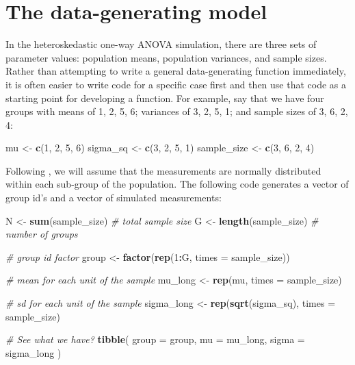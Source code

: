 \documentclass[
]{book}
\newenvironment{Shaded}{\begin{snugshade}}{\end{snugshade}}
\newcommand{\AttributeTok}[1]{\textcolor[rgb]{0.13,0.29,0.53}{#1}}
\newcommand{\CommentTok}[1]{\textcolor[rgb]{0.56,0.35,0.01}{\textit{#1}}}
\newcommand{\DecValTok}[1]{\textcolor[rgb]{0.00,0.00,0.81}{#1}}
\newcommand{\FunctionTok}[1]{\textcolor[rgb]{0.13,0.29,0.53}{\textbf{#1}}}
\newcommand{\NormalTok}[1]{#1}
\newcommand{\OtherTok}[1]{\textcolor[rgb]{0.56,0.35,0.01}{#1}}
\newcommand{\SpecialCharTok}[1]{\textcolor[rgb]{0.81,0.36,0.00}{\textbf{#1}}}
\begin{document}
\section{The data-generating model}\label{case-anova-DGP}

In the heteroskedastic one-way ANOVA simulation, there are three sets of parameter values: population means, population variances, and sample sizes.
Rather than attempting to write a general data-generating function immediately, it is often easier to write code for a specific case first and then use that code as a starting point for developing a function.
For example, say that we have four groups with means of 1, 2, 5, 6; variances of 3, 2, 5, 1; and sample sizes of 3, 6, 2, 4:

\begin{Shaded}
\begin{Highlighting}[]
\NormalTok{mu }\OtherTok{\textless{}{-}} \FunctionTok{c}\NormalTok{(}\DecValTok{1}\NormalTok{, }\DecValTok{2}\NormalTok{, }\DecValTok{5}\NormalTok{, }\DecValTok{6}\NormalTok{)}
\NormalTok{sigma\_sq }\OtherTok{\textless{}{-}} \FunctionTok{c}\NormalTok{(}\DecValTok{3}\NormalTok{, }\DecValTok{2}\NormalTok{, }\DecValTok{5}\NormalTok{, }\DecValTok{1}\NormalTok{)}
\NormalTok{sample\_size }\OtherTok{\textless{}{-}} \FunctionTok{c}\NormalTok{(}\DecValTok{3}\NormalTok{, }\DecValTok{6}\NormalTok{, }\DecValTok{2}\NormalTok{, }\DecValTok{4}\NormalTok{)}
\end{Highlighting}
\end{Shaded}

Following \citet{brown1974SmallSampleBehavior}, we will assume that the measurements are normally distributed within each sub-group of the population. The following code generates a vector of group id's and a vector of simulated measurements:

\begin{Shaded}
\begin{Highlighting}[]
\NormalTok{N }\OtherTok{\textless{}{-}} \FunctionTok{sum}\NormalTok{(sample\_size) }\CommentTok{\# total sample size}
\NormalTok{G }\OtherTok{\textless{}{-}} \FunctionTok{length}\NormalTok{(sample\_size) }\CommentTok{\# number of groups}

\CommentTok{\# group id factor}
\NormalTok{group }\OtherTok{\textless{}{-}} \FunctionTok{factor}\NormalTok{(}\FunctionTok{rep}\NormalTok{(}\DecValTok{1}\SpecialCharTok{:}\NormalTok{G, }\AttributeTok{times =}\NormalTok{ sample\_size))}

\CommentTok{\# mean for each unit of the sample}
\NormalTok{mu\_long }\OtherTok{\textless{}{-}} \FunctionTok{rep}\NormalTok{(mu, }\AttributeTok{times =}\NormalTok{ sample\_size) }

\CommentTok{\# sd for each unit of the sample}
\NormalTok{sigma\_long }\OtherTok{\textless{}{-}} \FunctionTok{rep}\NormalTok{(}\FunctionTok{sqrt}\NormalTok{(sigma\_sq), }\AttributeTok{times =}\NormalTok{ sample\_size) }

\CommentTok{\# See what we have?}
\FunctionTok{tibble}\NormalTok{( }\AttributeTok{group =}\NormalTok{ group, }\AttributeTok{mu =}\NormalTok{ mu\_long, }\AttributeTok{sigma =}\NormalTok{ sigma\_long )}
\end{Highlighting}
\end{Shaded}
\end{document}
